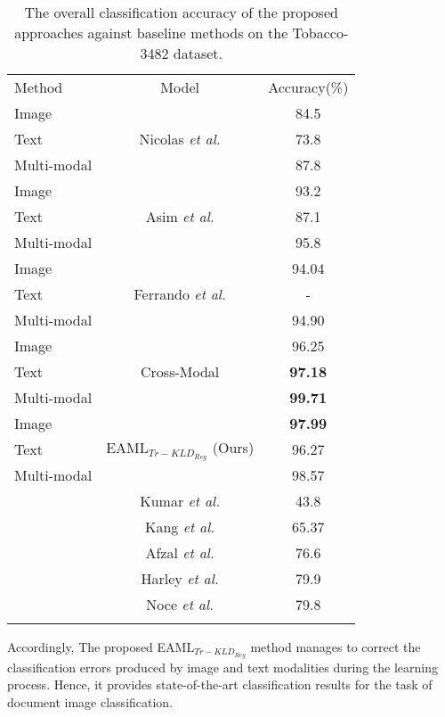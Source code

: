\documentclass[twocolumn]{svjour3}
\newcommand{\etal}{\textit{et al.}}
\begin{document}
\begin{table}[tbh]
\small
\centering
\caption{The overall classification accuracy of the proposed approaches against baseline methods on the Tobacco-3482 dataset.}

    \begin{tabular}{lcc}
    \hline\noalign{\smallskip}
     Method & Model & Accuracy(\%)\\
     \noalign{\smallskip}\hline\noalign{\smallskip}
    Image & \multirow{3}{*}{Nicolas \etal \cite{audebert2019multimodal}} & 84.5\\
    Text && 73.8\\
    Multi-modal && 87.8\\
    \noalign{\smallskip}\hline\noalign{\smallskip}
    Image & \multirow{3}{*}{Asim \etal \cite{Asim2019TwoSD}} & 93.2\\
    Text && 87.1\\
    Multi-modal && 95.8\\
    \noalign{\smallskip}\hline\noalign{\smallskip}
    Image & \multirow{3}{*}{Ferrando \etal \cite{Ferrando2020ImprovingAA}} & 94.04\\
    Text && -\\
    Multi-modal && 94.90\\
    \noalign{\smallskip}\hline\noalign{\smallskip}
    Image & \multirow{3}{*}{Cross-Modal \cite{9191268}} & 96.25\\
    Text && \textbf{97.18}\\
    Multi-modal && \textbf{99.71}\\
    \noalign{\smallskip}\hline\noalign{\smallskip}
    Image & \multirow{3}{*}{EAML$_{{Tr-KLD}_{Reg}}$ (Ours)} & \textbf{97.99}\\
    Text && 96.27\\
    Multi-modal && 98.57\\
    \noalign{\smallskip}\hline\noalign{\smallskip}
    \multirow{5}{*}{Baselines} 
    & Kumar \etal \cite{Kumar2014StructuralSF} & 43.8\\
    & Kang \etal \cite{6977258} & 65.37\\
    & Afzal \etal \cite{Afzal2015DeepdocclassifierDC} & 76.6\\
    & Harley \etal \cite{Harley2015EvaluationOD} & 79.9\\
    & Noce \etal \cite{Noce2016EmbeddedTC} & 79.8\\
    \noalign{\smallskip}\hline
    \end{tabular}
    \label{tab:ComparisontableonTobacco}
\end{table}
Accordingly, The proposed EAML$_{{Tr-KLD}_{Reg}}$ method manages to correct the classification errors produced by image and text modalities during the learning process. Hence, it provides state-of-the-art classification results for the task of document image classification. 
\end{document}
